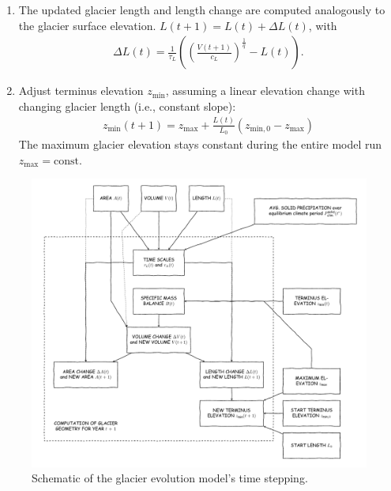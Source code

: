 \begin{enumerate}
            \item The updated glacier length and length change are computed analogously to the glacier surface elevation. $L(t+1) = L(t) + \Delta L(t)$, with
            \begin{align}
                \Delta L(t) = \frac{1}{\tau_L}\left(\left(\frac{V(t+1)}{c_L}\right)^\frac{1}{q} - L(t)\right).
            \end{align}
            \item Adjust terminus elevation $z_\text{min}$, assuming a linear elevation change with changing glacier length (i.e., constant slope):
            \begin{align}
                z_\text{min}(t+1) = z_\text{max} + \frac{L(t)}{L_0}(z_{\text{min},0} - z_\text{max})
            \end{align}
            The maximum glacier elevation stays constant during the entire model run $z_\text{max} = \text{const.}$
            
        \end{enumerate}
        
        \begin{figure}[tbh]
            \centering
            \includegraphics[width=\textwidth]{../flowchart/iterations/scaling.pdf}
            \caption{Schematic of the glacier evolution model's time stepping.}
            \label{fig:iteration-scheme}
        \end{figure}
        
